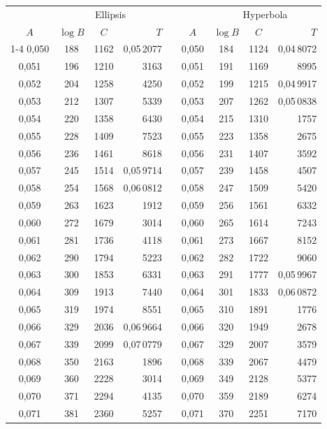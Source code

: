 \begin{tabular}{|c|c|c|r|@{}p{9pt}@{}|c|c|c|r|}
\hline
 & \multicolumn{3}{c|}{Ellipsis} & & & \multicolumn{3}{c|}{Hyperbola} \\
\(A\) & \(\log B\) & \(C\) & \(T\) & & \(A\) & \(\log B\) & \(C\) & \(T\) \\
\cline{1-4}\cline{6-9}
0,050 & 188 & 1162 & 0,05\,2077 &  & 0,050 & 184 & 1124 & 0,04\,8072 \\
0,051 & 196 & 1210 & 3163 &  & 0,051 & 191 & 1169 & 8995 \\
0,052 & 204 & 1258 & 4250 &  & 0,052 & 199 & 1215 & 0,04\,9917 \\
0,053 & 212 & 1307 & 5339 &  & 0,053 & 207 & 1262 & 0,05\,0838 \\
0,054 & 220 & 1358 & 6430 &  & 0,054 & 215 & 1310 & 1757 \\
0,055 & 228 & 1409 & 7523 &  & 0,055 & 223 & 1358 & 2675 \\[3pt]
0,056 & 236 & 1461 & 8618 &  & 0,056 & 231 & 1407 & 3592 \\
0,057 & 245 & 1514 & 0,05\,9714 &  & 0,057 & 239 & 1458 & 4507 \\
0,058 & 254 & 1568 & 0,06\,0812 &  & 0,058 & 247 & 1509 & 5420 \\
0,059 & 263 & 1623 & 1912 &  & 0,059 & 256 & 1561 & 6332 \\
0,060 & 272 & 1679 & 3014 &  & 0,060 & 265 & 1614 & 7243 \\[3pt]
0,061 & 281 & 1736 & 4118 &  & 0,061 & 273 & 1667 & 8152 \\
0,062 & 290 & 1794 & 5223 &  & 0,062 & 282 & 1722 & 9060 \\
0,063 & 300 & 1853 & 6331 &  & 0,063 & 291 & 1777 & 0,05\,9967 \\
0,064 & 309 & 1913 & 7440 &  & 0,064 & 301 & 1833 & 0,06\,0872 \\
0,065 & 319 & 1974 & 8551 &  & 0,065 & 310 & 1891 & 1776 \\[3pt]
0,066 & 329 & 2036 & 0,06\,9664 &  & 0,066 & 320 & 1949 & 2678 \\
0,067 & 339 & 2099 & 0,07\,0779 &  & 0,067 & 329 & 2007 & 3579 \\
0,068 & 350 & 2163 & 1896 &  & 0,068 & 339 & 2067 & 4479 \\
0,069 & 360 & 2228 & 3014 &  & 0,069 & 349 & 2128 & 5377 \\
0,070 & 371 & 2294 & 4135 &  & 0,070 & 359 & 2189 & 6274 \\[3pt]
0,071 & 381 & 2360 & 5257 &  & 0,071 & 370 & 2251 & 7170 \\

\end{tabular}
